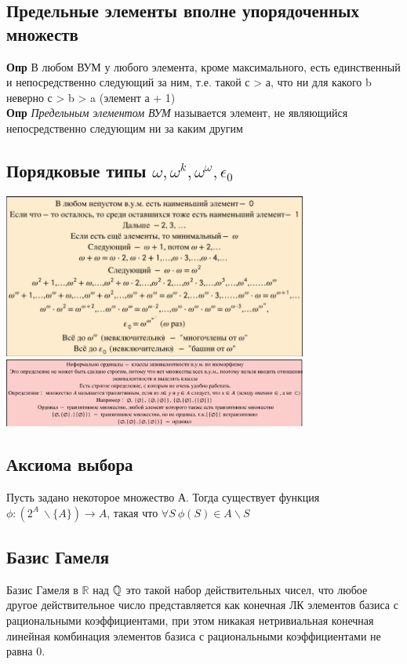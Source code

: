 \subsection{Предельные элементы вполне упорядоченных множеств}

\textbf{Опр} В любом ВУМ у любого элемента, кроме максимального, есть единственный и непосредственно следующий за ним, т.е. такой с > а, что ни для какого b неверно с > b > a (элемент а + 1)
\\
\textbf{Опр} \textit{Предельным элементом ВУМ} называется элемент, не являющийся непосредственно следующим ни за каким другим
\\
\subsection{Порядковые типы $\omega, \omega^k, \omega^{\omega}, \epsilon_0$}
\begin{center}
        \includegraphics[width = 0.75\textwidth]{images/2 (определения)_m26.PNG}
    \includegraphics[width = 0.75\textwidth]{images/2 (определения)_m27.PNG}
\end{center}

\subsection{Аксиома выбора}

Пусть задано некоторое множество А. Тогда существует функция $\phi: (2^A\ \backslash \{A\}) \rightarrow A$, такая что $\forall S \ \phi(S) \in A\backslash S$
\\
\subsection{Базис Гамеля}

Базис Гамеля в $\mathbb R$ над $\mathbb{Q}$ это такой набор действительных чисел, что любое другое действительное число представляется как конечная ЛК элементов базиса с рациональными коэффициентами, при этом никакая нетривиальная конечная линейная комбинация элементов базиса с рациональными коэффициентами не равна $0$.